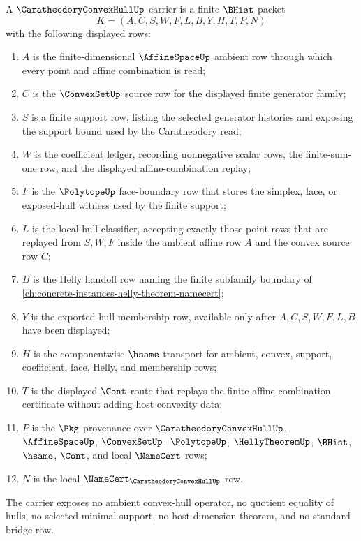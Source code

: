 \begin{definition}
\label{def:caratheodory-convex-hull-carrier}
A $\CaratheodoryConvexHullUp$ carrier is a finite $\BHist$ packet
$$
K=(A,C,S,W,F,L,B,Y,H,T,P,N)
$$
with the following displayed rows:
\begin{enumerate}
\item $A$ is the finite-dimensional $\AffineSpaceUp$ ambient row through which every point and affine combination is read;
\item $C$ is the $\ConvexSetUp$ source row for the displayed finite generator family;
\item $S$ is a finite support row, listing the selected generator histories and exposing the support bound used by the Caratheodory read;
\item $W$ is the coefficient ledger, recording nonnegative scalar rows, the finite-sum-one row, and the displayed affine-combination replay;
\item $F$ is the $\PolytopeUp$ face-boundary row that stores the simplex, face, or exposed-hull witness used by the finite support;
\item $L$ is the local hull classifier, accepting exactly those point rows that are replayed from $S,W,F$ inside the ambient affine row $A$ and the convex source row $C$;
\item $B$ is the Helly handoff row naming the finite subfamily boundary of \autoref{ch:concrete-instances-helly-theorem-namecert};
\item $Y$ is the exported hull-membership row, available only after $A,C,S,W,F,L,B$ have been displayed;
\item $H$ is the componentwise $\hsame$ transport for ambient, convex, support, coefficient, face, Helly, and membership rows;
\item $T$ is the displayed $\Cont$ route that replays the finite affine-combination certificate without adding host convexity data;
\item $P$ is the $\Pkg$ provenance over $\CaratheodoryConvexHullUp$, $\AffineSpaceUp$, $\ConvexSetUp$, $\PolytopeUp$, $\HellyTheoremUp$, $\BHist$, $\hsame$, $\Cont$, and local $\NameCert$ rows;
\item $N$ is the local $\NameCert_{\CaratheodoryConvexHullUp}$ row.
\end{enumerate}
The carrier exposes no ambient convex-hull operator, no quotient equality of hulls, no selected minimal support, no host dimension theorem, and no standard bridge row.
\end{definition}

